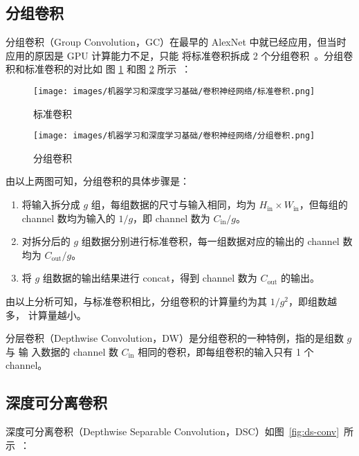 \subsection{分组卷积}

分组卷积（Group Convolution，GC）在最早的 AlexNet 中就已经应用，但当时应用的原因是 GPU 计算能力不足，只能
将标准卷积拆成 2 个分组卷积~。分组卷积和标准卷积的对比如
图 \ref{fig:normal-conv} 和图 \ref{fig:group-conv} 所示~：

\begin{figure}[ht]
  \centering
  \texttt{[image: images/机器学习和深度学习基础/卷积神经网络/标准卷积.png]}
  \caption{标准卷积}
  \label{fig:normal-conv}
\end{figure}

\begin{figure}[ht]
  \centering
  \texttt{[image: images/机器学习和深度学习基础/卷积神经网络/分组卷积.png]}
  \caption{分组卷积}
  \label{fig:group-conv}
\end{figure}

由以上两图可知，分组卷积的具体步骤是：

\begin{enumerate}
  \item 将输入拆分成 $g$ 组，每组数据的尺寸与输入相同，均为 $H_{\mathrm{in}}
    \times W_{\mathrm{in}}$，但每组的 channel 数均为输入的 $ 1/g $，即 channel
    数为 $ C_{\mathrm{in}} / g $。
  \item 对拆分后的 $g$ 组数据分别进行标准卷积，每一组数据对应的输出的 channel 数
    均为 $ C_{\mathrm{out}}/g $。
  \item 将 $g$ 组数据的输出结果进行 concat，得到 channel 数为 $C_{\mathrm{out}}$
    的输出。
\end{enumerate}

由以上分析可知，与标准卷积相比，分组卷积的计算量约为其 $ 1 / g^2 $，即组数越多，
计算量越小。

分层卷积（Depthwise Convolution，DW）是分组卷积的一种特例，指的是组数 $g$ 与 输
入数据的 channel 数 $C_{\mathrm{in}}$ 相同的卷积，即每组卷积的输入只有 1 个 channel。

\subsection{深度可分离卷积}

深度可分离卷积（Depthwise Separable Convolution，DSC）如图~\ref{fig:ds-conv}~所
示~：

